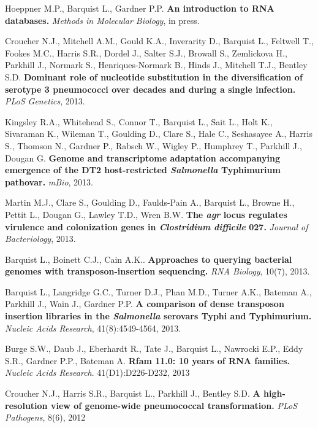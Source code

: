 \item{Hoeppner M.P., Barquist L., Gardner P.P. \textbf{An introduction to RNA databases.} \textit{Methods in Molecular Biology}, in press.} 

\item{Croucher N.J., Mitchell A.M., Gould K.A., Inverarity D., Barquist L., Feltwell T., Fookes M.C., Harris S.R., Dordel J., Salter S.J., Browall S., Zemlickova H., Parkhill J., Normark S., Henriques-Normark B., Hinds J., Mitchell T.J., Bentley S.D. \textbf{Dominant role of nucleotide substitution in the diversification of serotype 3 pneumococci over decades and during a single infection.} \textit{PLoS Genetics}, 2013.} 

\item{Kingsley R.A., Whitehead S., Connor T., Barquist L., Sait L., Holt K., Sivaraman K., Wileman T., Goulding D., Clare S., Hale C., Seshasayee A., Harris S., Thomson N., Gardner P., Rabsch W., Wigley P., Humphrey T., Parkhill J., Dougan G. \textbf{Genome and transcriptome adaptation accompanying emergence of the DT2 host-restricted \textit{Salmonella} Typhimurium pathovar.}  \textit{mBio}, 2013.}

\item{Martin M.J., Clare S., Goulding D., Faulds-Pain A., Barquist L., Browne H., Pettit L., Dougan G., Lawley T.D.,  Wren B.W. \textbf{The \textit{agr} locus regulates virulence and colonization genes in \textit{Clostridium difficile} 027.} \textit{Journal of Bacteriology}, 2013. }

\item{Barquist L., Boinett C.J., Cain A.K..  \textbf{Approaches to querying bacterial genomes with transposon-insertion sequencing.} \textit{RNA Biology}, 10(7), 2013.}

\item{Barquist L., Langridge G.C., Turner D.J., Phan M.D., Turner A.K., Bateman A., Parkhill J., Wain J., Gardner P.P. \textbf{A comparison of dense transposon insertion libraries in the \textit{Salmonella} serovars Typhi and Typhimurium.} \textit{Nucleic Acids Research}, 41(8):4549-4564, 2013.} 

\item{Burge S.W., Daub J., Eberhardt R., Tate J., Barquist L., Nawrocki E.P., Eddy S.R., Gardner P.P., Bateman A. \textbf{Rfam 11.0: 10 years of RNA families.} \textit{Nucleic Acids Research}. 41(D1):D226-D232, 2013}

\item{Croucher N.J., Harris S.R., Barquist L., Parkhill J., Bentley S.D. \textbf{A high-resolution view of genome-wide pneumococcal transformation.} \textit{PLoS Pathogens}, 8(6), 2012}

